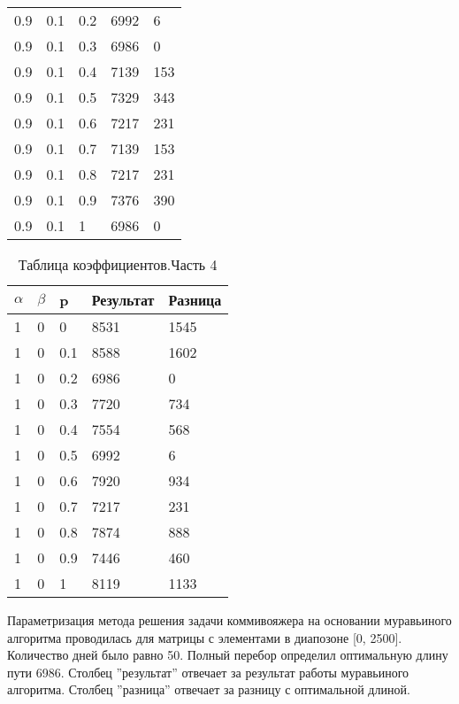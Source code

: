 \begin{table}[ht]
\begin{tabular}{ | l | l | l | l | l |}
		0.9      & 0.1     & 0.2 & 6992      & 6       \\
		0.9      & 0.1     & 0.3 & 6986      & 0       \\
		0.9      & 0.1     & 0.4 & 7139      & 153     \\
		0.9      & 0.1     & 0.5 & 7329      & 343     \\
		0.9      & 0.1     & 0.6 & 7217      & 231     \\
		0.9      & 0.1     & 0.7 & 7139      & 153     \\
		0.9      & 0.1     & 0.8 & 7217      & 231     \\
		0.9      & 0.1     & 0.9 & 7376      & 390     \\
		0.9      & 0.1     & 1   & 6986      & 0       \\
		\hline
	\end{tabular}
\end{table}


\begin{table}[ht]
	\centering
	\caption{Таблица коэффициентов.Часть 4}
	\label{table:ref4}
	\begin{tabular}{ | l | l | l | l | l |}
		\hline
		$\alpha$ & $\beta$ & p   & Результат & Разница \\
		\hline
		1        & 0       & 0   & 8531      & 1545    \\
		1        & 0       & 0.1 & 8588      & 1602    \\
		1        & 0       & 0.2 & 6986      & 0       \\
		1        & 0       & 0.3 & 7720      & 734     \\
		1        & 0       & 0.4 & 7554      & 568     \\
		1        & 0       & 0.5 & 6992      & 6       \\
		1        & 0       & 0.6 & 7920      & 934     \\
		1        & 0       & 0.7 & 7217      & 231     \\
		1        & 0       & 0.8 & 7874      & 888     \\
		1        & 0       & 0.9 & 7446      & 460     \\
		1        & 0       & 1   & 8119      & 1133    \\
		\hline
	\end{tabular}
\end{table}

\newpage

Параметризация метода решения задачи коммивояжера
на основании муравьиного алгоритма проводилась для матрицы с
элементами в диапозоне [0, 2500].
Количество дней было равно 50.
Полный перебор определил оптимальную длину пути 6986.
Столбец ''результат'' отвечает за результат работы муравьиного алгоритма.
Столбец ''разница'' отвечает за разницу с оптимальной длиной.




